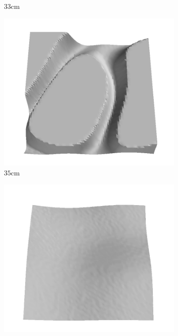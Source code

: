 \documentclass[../document.tex]{subfiles}
\begin{document}
\begin{figure}[htbp]
\begin{subfigure}[b]{0.19\textwidth}
    \caption{$33$cm}
    \end{subfigure}
    \begin{subfigure}[b]{0.19\textwidth}
    \includegraphics[width=\linewidth]{../img/5/train/all/35-patch-3d-majavi-18.png}
    \caption{$35$cm}
    \end{subfigure}
    \begin{subfigure}[b]{0.19\textwidth}
    \includegraphics[width=\linewidth]{../img/5/train/all/38-patch-3d-majavi-19.png}

\end{subfigure}
\end{figure}
\end{document}

